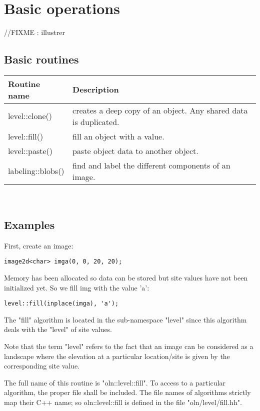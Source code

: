 \documentclass{report}
\begin{document}
\chapter{Basic operations}
//FIXME : illustrer

\section{Basic routines}
\begin{tabular}{|l|p{8cm}|}
\hline
Routine name & Description \\ \hline
level::clone() & creates a deep copy of an object. Any shared data is
duplicated. \\ \hline

level::fill() & fill an object with a value. \\ \hline

level::paste() & paste object data to another object. \\ \hline

labeling::blobs() & find and label the different components of an image. \\
\hline
\end{tabular} \\


\section{Examples}
First, create an image:
\begin{lstlisting}[frame=single]
  image2d<char> imga(0, 0, 20, 20);
\end{lstlisting}

Memory has been allocated so data can be stored but site values
have not been initialized yet.  So we fill img with the value 'a':
\begin{lstlisting}[frame=single]
  level::fill(inplace(imga), 'a');
\end{lstlisting}

The "fill" algorithm is located in the sub-namespace "level" since this
algorithm deals with the "level" of site values.

Note that the term "level" refers to the fact that an image can be considered as
a landscape where the elevation at a particular location/site is given by
the corresponding site value.

The full name of this routine is "oln::level::fill".  To access to a particular
algorithm, the proper file shall be included. The file names of algorithms
strictly map their C++ name; so oln::level::fill is defined in the file
"oln/level/fill.hh".
\end{document}
